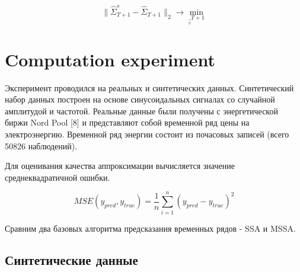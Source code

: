\documentclass{article}
\begin{document}
\begin{equation}
    \| \hat{\Sigma}_{T+1}^s - \hat{\Sigma}_{T+1} \|_2 \to \min_{\underset x_{T+1}}
\end{equation}






\section{Computation experiment}

Эксперимент проводился на реальных и синтетических данных. Синтетический набор данных построен на основе синусоидальных сигналах со случайной амплитудой и частотой. Реальные данные были получены с энергетической биржи Nord Pool [8] и представляют собой временной ряд цены на электроэнергию. Временной ряд энергии состоит из почасовых записей (всего 50826 наблюдений). 

Для оценивания качества аппроксимации вычисляется значение среднеквадратичной ошибки.

\begin{equation}
MSE(y_{pred}, y_{true}) = \frac{1}{n} \sum_{i=1}^n (y_{pred} - y_{true})^2
\end{equation}

Сравним два базовых алгоритма предсказания временных рядов - SSA и MSSA.

\subsection{Синтетические данные}
\end{document}
